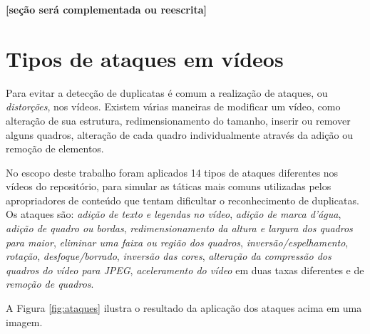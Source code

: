 \textbf{[seção será complementada ou reescrita]}





\section{Tipos de ataques em vídeos}
\label{sec:ataques}

	Para evitar a detecção de duplicatas é comum a realização de ataques, ou \textit{distorções}, nos vídeos. Existem várias maneiras de modificar um vídeo, como alteração de sua estrutura, redimensionamento do tamanho, inserir ou remover alguns quadros, alteração de cada quadro individualmente através da adição ou remoção de elementos.

	No escopo deste trabalho foram aplicados 14 tipos de ataques diferentes nos vídeos do repositório, para simular as táticas mais comuns utilizadas pelos apropriadores de conteúdo que tentam dificultar o reconhecimento de duplicatas. Os ataques são: \textit{adição de texto e legendas no vídeo}, \textit{adição de marca d'água}, \textit{adição de quadro ou bordas}, \textit{redimensionamento da altura e largura dos quadros para maior}, \textit{eliminar uma faixa ou região dos quadros}, \textit{inversão/espelhamento}, \textit{rotação}, \textit{desfoque/borrado}, \textit{inversão das cores}, \textit{alteração da compressão dos quadros do vídeo para JPEG}, \textit{aceleramento do vídeo} em duas taxas diferentes e de \textit{remoção de quadros}.

A Figura \ref{fig:ataques} ilustra o resultado da aplicação dos ataques acima em uma imagem.

 
    
